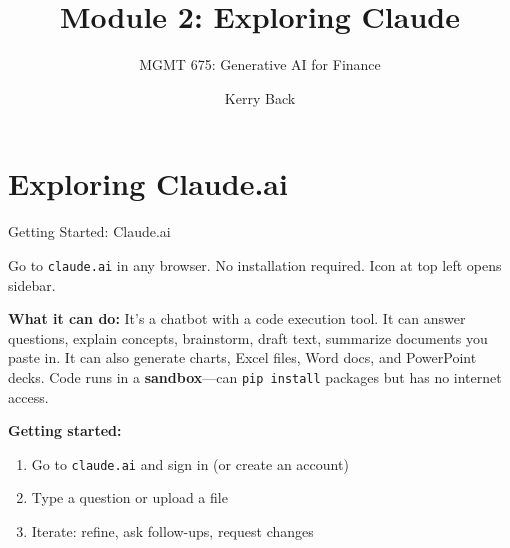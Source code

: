 \documentclass[aspectratio=169]{beamer}
\subtitle{MGMT 675: Generative AI for Finance}
\title{Module 2: Exploring Claude}
\author{Kerry Back}
\date{}
\begin{document}
\maketitle

\section{Exploring Claude.ai}

\begin{frame}{Getting Started: Claude.ai}

Go to \texttt{claude.ai} in any browser. No installation required.  Icon at top left opens sidebar.

\textbf{What it can do:}
It's a chatbot with a code execution tool.  It can answer questions, explain concepts, brainstorm, draft text, summarize documents you paste in.  It can also generate charts, Excel files, Word docs, and PowerPoint decks.  Code runs in a \textbf{sandbox}---can \texttt{pip install} packages but has \alert{no internet access}.

\textbf{Getting started:}
\begin{enumerate}\small
  \item Go to \texttt{claude.ai} and sign in (or create an account)
  \item Type a question or upload a file
  \item Iterate: refine, ask follow-ups, request changes
\end{enumerate}
\end{frame}
\end{document}
